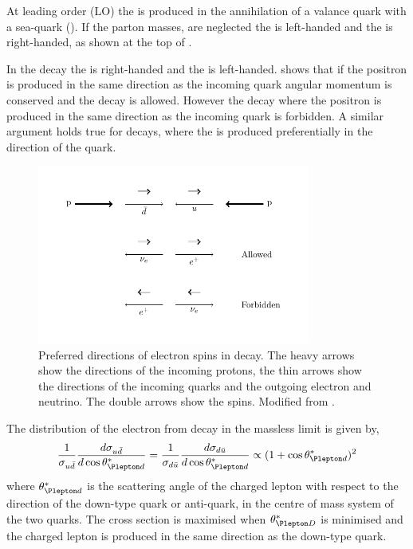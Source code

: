 At leading order (LO) the \PWp is produced in the annihilation of a \Pup valance quark
with a \APdown sea-quark (). 
If the parton masses, are neglected the \Pup is left-handed and the \APdown is
right-handed, as shown at the top of . 

In the \PWp decay the \Ppositron is right-handed and the \Pnue is left-handed.
 shows that if the  positron is produced in the same direction
as the incoming \APdown quark angular momentum is conserved and the decay is
allowed.
However the decay where the positron is produced in the same direction as the
incoming \Pup quark is forbidden.
A similar argument holds true for \PWm decays, where the \Pelectron is produced
preferentially in the direction of the \Pdown quark.

\begin{figure}[htbp]
  \centering
  \includegraphics[width=0.8\textwidth]{w_decay_directions}
  \caption[Preferred directions of electron spins in
\HepProcess{\PWplus\to\APelectron\Pnue} decay.] {Preferred directions of
electron spins in \HepProcess{\PWplus\to\APelectron\Pnue} decay.  The heavy
arrows show the directions of the incoming protons, the thin arrows show the
directions of the incoming quarks and the outgoing electron and neutrino. The
double arrows show the spins.  Modified from \cite{aitchison2004gauge}. }
  \label{wbos:wspin}
\end{figure}

The distribution of the electron from \PWpm decay in the massless limit
is given by\cite{perkins2000introduction,aitchison2004gauge},
\begin{equation}
  \frac{1}{\sigma_{u\bar{d}}}
  \frac{d \sigma_{u\bar{d}}}{d \cos \theta_{\Plepton d}^{\ast}}
  =
  \frac{1}{\sigma_{d\bar{u}}}
  \frac{d \sigma_{d\bar{u}}}{d \cos \theta_{\Plepton d}^{\ast}}
  \propto
  (1+\cos \theta_{\Plepton d}^{\ast})^2
  \label{wbos:lepton}
\end{equation}
where $\theta_{\Plepton d}^{\ast}$ is the scattering angle of the charged
lepton with respect to the direction of the down-type quark or anti-quark, in
the centre of mass system of the two quarks. The cross section is maximised when
$\theta_{\Plepton D}^{\ast}$ is minimised and the charged lepton is produced in
the same direction as the down-type quark.

